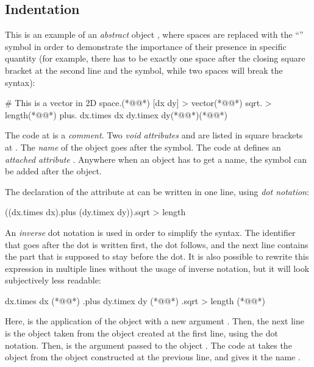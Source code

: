 \subsection{Indentation}

This is an example of an \emph{abstract} object , where
spaces are replaced with the ``\textvisiblespace'' symbol in order to demonstrate
the importance of their presence in specific quantity
(for example, there has to be exactly one space after the closing square bracket at the
second line and the \ff{>} symbol, while two spaces will break the syntax):

{\lstset{showspaces=true}\begin{ffcode}
# This is a vector in 2D space.(*@\label{ln:comment}@*)
[dx dy] > vector(*@\label{ln:vector}@*)
  sqrt. > length(*@\label{ln:length}@*)
    plus.
      dx.times dx
      dy.timex dy(*@\label{ln:length-end}@*)(*@\label{ln:vector-end}@*)
\end{ffcode}
}

The code at  is a \emph{comment}.
Two \emph{void attributes}  and 
are listed in square brackets at .
The \emph{name} of the object goes after the \ff{>} symbol.
The code at  defines
an \emph{attached attribute} . Anywhere when an object
has to get a name, the \ff{>} symbol can be added after the object.

The declaration of the attribute  at 
can be written in one line, using \emph{dot notation}:

\begin{ffcode}
((dx.times dx).plus (dy.timex dy)).sqrt > length
\end{ffcode}

An \emph{inverse} dot notation is used in order to simplify
the syntax. The identifier that goes after the dot is written
first, the dot follows, and the next line contains the part
that is supposed to stay before the dot. It is also possible to rewrite
this expression in multiple lines without the usage of
inverse notation, but it will look subjectively less readable:

\begin{ffcode}
dx.times dx (*@\label{ln:dx-pow}@*)
.plus
  dy.timex dy (*@\label{ln:dx-pow-2}@*)
.sqrt > length (*@\label{ln:dx-pow-3}@*)
\end{ffcode}

Here,  is the application of the object  with
a new argument . Then, the next line is the object  taken
from the object created at the first line, using the dot notation. Then,
 is the argument passed to the object .
The code at  takes the object  from the object constructed
at the previous line, and gives it the name .

